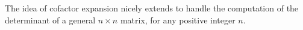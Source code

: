 \documentclass{ximera}
\begin{document}
  The idea of cofactor expansion nicely extends to handle the
  computation of the determinant of a general $n \times n$ matrix, for any
  positive integer $n$.



\end{document}
